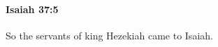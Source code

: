 
		\paragraph{Isaiah 37:5} %
			\label{ISAIAH-37-5}

			So the servants of king Hezekiah came to Isaiah.



